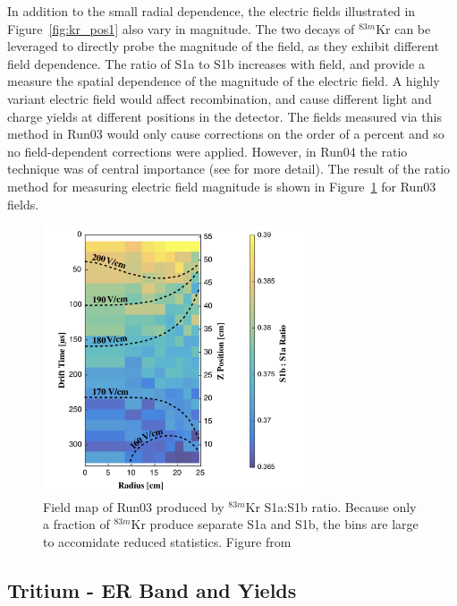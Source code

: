 In addition to the small radial dependence, the electric fields illustrated in Figure~\ref{fig:kr_pos1} also vary in magnitude. The two decays of $^{83m}$Kr can be leveraged to directly probe the magnitude of the field, as they exhibit different field dependence. The ratio of S1a to S1b increases with field, and provide a measure the spatial dependence of the magnitude of the electric field. A highly variant electric field would affect recombination, and cause different light and charge yields at different positions in the detector. The fields measured via this method in Run03 would only cause corrections on the order of a percent and so no field-dependent corrections were applied. However, in Run04 the ratio technique was of central importance (see \cite{LUXCombinedExposure} \cite{LUXFields} \cite{LUXKr} for more detail). The result of the ratio method for measuring electric field magnitude is shown in Figure~\ref{fig:kr_3} for Run03 fields.

\begin{figure}[htbp]
\begin{center}
\includegraphics[width=0.69\textwidth]{figures/lux/kr_3.png}
\caption{Field map of Run03 produced by $^{83m}$Kr S1a:S1b ratio. Because only a fraction of $^{83m}$Kr produce separate S1a and S1b, the bins are large to accomidate reduced statistics. Figure from \cite{LUXKr} }
\label{fig:kr_3}
\end{center}
\end{figure}

\subsection{Tritium - ER Band and Yields}

